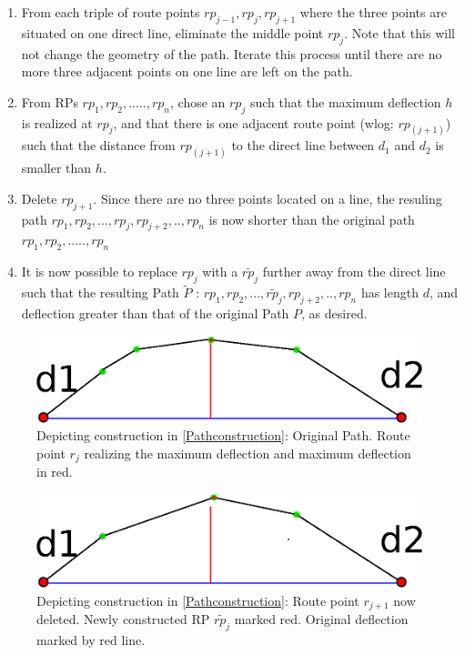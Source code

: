 \begin{enumerate}
	\item{From each triple of route points $rp_{j-1},rp_{j},rp_{j+1}$  where the three points are situated on
	      one direct line, eliminate the middle point $rp_{j}$. Note that this will not change the geometry of the path.
	      Iterate this process until there are no more three adjacent points on one line are left on the path.
	      }

	\item{From RPs $rp_1,rp_2,.....,rp_n$, chose an $rp_j$ such that the maximum deflection $h$ is realized at 
	      $rp_j$, and that there is one adjacent route point (wlog: $rp_{(j+1)}$}) such that
 	      the distance from $rp_{(j+1)}$ to the direct line between $d_1$ and $d_2$ is smaller than $h$.
	
	\item{Delete $rp_{j+1}$. Since there are no three points located on a line, the resuling path 
               $rp_1,rp_2,...,rp_j,rp_{j+2},..,rp_n$ is now shorter than the original path $rp_1,rp_2,.....,rp_n$
	      }

        \item{ It is now possible to replace $rp_j$ with a $\tilde{rp_j}$ further away from the direct line such that
	       the resulting Path  $\tilde{P}$ : $rp_1,rp_2,...,\tilde{rp_j},rp_{j+2},..,rp_n$ has length $d$,
	       and deflection greater than that of the original Path $P$, as desired. 	
	      }
\end{enumerate}

 
\begin{figure}[h]
\includegraphics[scale=0.5]{images/03.02.deflection.eps}
\caption{Depicting construction in \ref{Pathconstruction}: 
	Original Path. Route point $r_j$ realizing the maximum deflection and maximum deflection
	in red.
	}
\end{figure}

\begin{figure}[h]
\includegraphics[scale=0.5]{images/03.03.deflection.eps}
\caption{
	Depicting construction in \ref{Pathconstruction}: 
	Route point $r_{j+1}$ now deleted. 
	Newly constructed RP $\tilde{rp_j}$ marked red.
	Original deflection marked by red line. 
	}
\end{figure}

